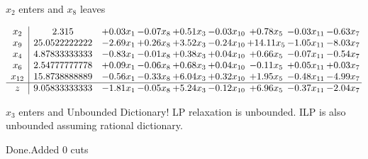 \documentclass[8pt]{article}
\begin{document}
 $ x_{2} $ enters and $ x_{8} $ leaves 

 \[\begin{array}{c| c c@{\hskip 2pt} c@{\hskip 2pt} c@{\hskip 2pt} c@{\hskip 2pt} c@{\hskip 2pt} c@{\hskip 2pt} c@{\hskip 2pt} }
 x_{2}   &  2.315 & +  0.03 x_{1} & -0.07 x_{8} & +  0.51 x_{3} & -0.03 x_{10} & +  0.78 x_{5} & -0.03 x_{11} & -0.63 x_{7}\\
 x_{9}   &  25.0522222222 & -2.69 x_{1} & +  0.26 x_{8} & +  3.52 x_{3} & -0.24 x_{10} & + 14.11 x_{5} & -1.05 x_{11} & -8.03 x_{7}\\
 x_{4}   &  4.87833333333 & -0.83 x_{1} & -0.01 x_{8} & +  0.38 x_{3} & +  0.04 x_{10} & +  0.66 x_{5} & -0.07 x_{11} & -0.54 x_{7}\\
 x_{6}   &  2.54777777778 & +  0.09 x_{1} & -0.06 x_{8} & +  0.68 x_{3} & +  0.04 x_{10} & -0.11 x_{5} & +  0.05 x_{11} & +  0.03 x_{7}\\
 x_{12}   &  15.8738888889 & -0.56 x_{1} & -0.33 x_{8} & +  6.04 x_{3} & +  0.32 x_{10} & +  1.95 x_{5} & -0.48 x_{11} & -4.99 x_{7}\\
\hline
z    &  9.05833333333 & -1.81 x_{1} & -0.05 x_{8} & +  5.24 x_{3} & -0.12 x_{10} & +  6.96 x_{5} & -0.37 x_{11} & -2.04 x_{7}\\
\end{array}\]


 $ x_{3} $ enters and Unbounded Dictionary!
 LP relaxation is unbounded. ILP is also unbounded assuming rational dictionary. 

Done.Added 0 cuts 
\end{document}
